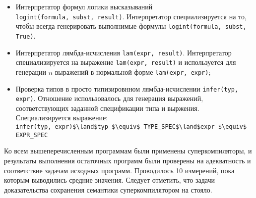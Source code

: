 \begin{itemize}
 \item Интерпретатор формул логики высказываний \\ \lstinline{logint(formula, subst, result)}.
       Интерпретатор специализируется на то, чтобы всегда генерировать выполнимые формулы
       \lstinline{logint(formula, subst, True)}.
 \item Интерпретатор лямбда-исчисления \lstinline{lam(expr, result)}.
       Интерпретатор специализируется на выражение \lstinline{lam(expr, result)}
       и используется для генерации $n$ выражений в нормальной форме \lstinline{lam(expr, expr)};
 \item Проверка типов в просто типизировнном лямбда-исчислении \lstinline{infer(typ, expr)}.
     Отношение использовалось для генерация выражений, соответствующих заданной спецификации типа и выржения.
     Специализируется выражение:\\
 	 \lstinline{infer(typ, expr)$\land$typ $\equiv$ TYPE_SPEC$\land$expr $\equiv$ EXPR_SPEC}
\end{itemize}

Ко всем вышеперечисленным программам были применены суперкомпиляторы,
и результаты выполнения остаточных программ были проверены на адекватность и соответствие задачам исходных программ.
Проводилось 10 измерений, пока которым выводились средние значения.
Следует отметить, что задачи доказательства сохранения семантики суперкомпилятором на стояло.

